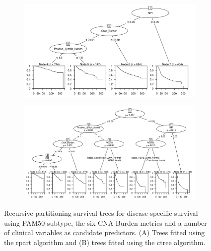 \begin{figure}[!h]
\centering

\vspace{1cm}

\begin{subfigure}{\textwidth}
\subcaption{}
\includegraphics[width=1\textwidth]{../figures/Chapter_3/Clin_PartyKit_Survival_Burden_DSS_PAM50.png}
\end{subfigure}

\vspace{3cm}

\begin{subfigure}{\textwidth}
\subcaption{}
\includegraphics[width=1\textwidth]{../figures/Chapter_3/Clin_Ctree_Survival_Burden_DSS_PAM50.png}
\end{subfigure}

\vspace{1cm}

\caption[Recursive partitioning survival trees for disease-specific survival using PAM50 subtype, the six CNA Burden metrics and a number of clinical variables as candidate predictors.]{Recursive partitioning survival trees for disease-specific survival using PAM50 subtype, the six CNA Burden metrics and a number of clinical variables as candidate predictors. (A) Trees fitted using the rpart algorithm and (B) trees fitted using the ctree algorithm.}
\label{fig:PAM50_CNA_Burden_DSS_Clin}
\end{figure}

